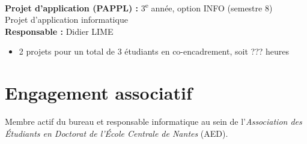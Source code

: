 \medskip\noindent
\textbf{Projet d'application (PAPPL) :} 3\textsuperscript{e} année, option INFO (semestre 8)\\
Projet d'application informatique\\
\textbf{Responsable :} Didier LIME

\begin{itemize}
  \item 2 projets pour un total de 3 étudiants en co-encadrement, soit ??? heures
\end{itemize}




\section{Engagement associatif}
Membre actif du bureau et responsable informatique au sein de l'\emph{Association des Étudiants en Doctorat de l'École Centrale de Nantes} (AED).

